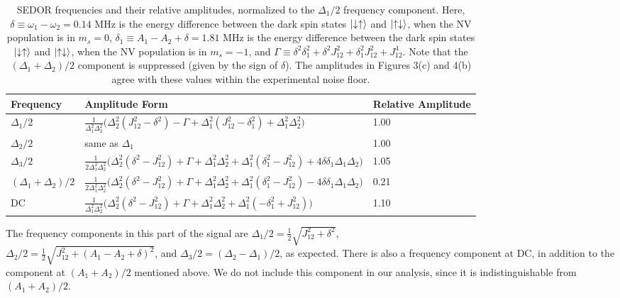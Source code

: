\documentclass[%
 reprint,
 amsmath,amssymb,
 aps,
]{revtex4-1}
\begin{document}
\begin{table}[h!]
\centering
\begin{tabular}{ |p{2cm}|p{9cm}|p{2cm}| } 
\hline
 Frequency & Amplitude Form & Relative Amplitude\\ \hline
 $\Delta_{1}/2$ & $\frac{1}{\Delta_1^2 \Delta_2^2}\Big(\Delta_2^2(J_{12}^2 - \delta^2) - \Gamma + \Delta_1^2(J_{12}^2-\delta_1^2) + \Delta_1^2 \Delta_2^2\Big) $ &1.00
 
 \\ \hline
 $\Delta_{2}/2$& same as $\Delta_1$ & 1.00
 
 \\
 \hline
 $\Delta_{3}/2$ & $\frac{1}{2\Delta_1^2\Delta_2^2}\Big( \Delta_2^2(\delta^2 - J_{12}^2) + \Gamma + \Delta_1^2 \Delta_2^2 + \Delta_1^2(\delta_1^2 - J_{12}^2) + 4 \delta \delta_1 \Delta_1\Delta_2 \Big)$ & 1.05
 
 
 \\ \hline
 $(\Delta_{1}+\Delta_{2})/2$&$\frac{1}{2\Delta_1^2\Delta_2^2}\Big( \Delta_2^2(\delta^2 - J_{12}^2) + \Gamma + \Delta_1^2 \Delta_2^2 + \Delta_1^2(\delta_1^2 - J_{12}^2) - 4 \delta \delta_1 \Delta_1\Delta_2  \Big)$ &0.21
   \\ \hline
 DC&$\frac{1}{\Delta_1^2\Delta_2^2}\Big( \Delta_2^2(\delta^2 - J_{12}^2) + \Gamma + \Delta_1^2 \Delta_2^2 + \Delta_1^2(-\delta_1^2 + J_{12}^2) \Big)$ &1.10
\\ \hline
 
\end{tabular}
\caption{SEDOR frequencies and their relative amplitudes, normalized to the $\Delta_1/2$ frequency component. Here, $\delta \equiv \omega_1 - \omega_2 = 0.14 \text{ MHz}$ is the energy difference between the dark spin states $\ket{\downarrow\uparrow}$ and $\ket{\uparrow\downarrow}$, when the NV population is in $m_s = 0$, $\delta_1 \equiv A_1 - A_2 + \delta = 1.81 \text{ MHz}$ is the energy difference between the dark spin states $\ket{\downarrow\uparrow}$ and $\ket{\uparrow\downarrow}$, when the NV population is in $m_s = -1$, and $\Gamma \equiv \delta^2 \delta_1^2 + \delta^2 J_{12}^2 + \delta_1^2 J_{12}^2 + J_{12}^4$. Note that the $(\Delta_1 + \Delta_2)/2$ component is suppressed (given by the sign of $\delta$). The amplitudes in Figures 3(c) and 4(b) agree with these values within the experimental noise floor.}
\label{table:S2}
\end{table}

The frequency components in this part of the signal are $\Delta_{1}/2 = \frac{1}{2}\sqrt{J_{12}^2 + \delta^2}$, \\$\Delta_{2}/2 = \frac{1}{2}\sqrt{J_{12}^2 + (A_{1} - A_{2} + \delta)^2}$, and $\Delta_{3}/2 = (\Delta_{2} - \Delta_{1})/2$, as expected. There is also a frequency component at DC, in addition to the component at $(A_1 + A_2)/2$ mentioned above. We do not include this component in our analysis, since it is indistinguishable from $(A_1 + A_2)/2$. 
\end{document}
